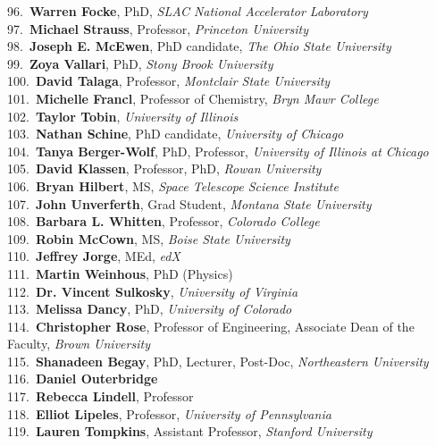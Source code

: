 96.~{\bf Warren Focke}, PhD, {\sl SLAC National Accelerator Laboratory} \\
97.~{\bf Michael Strauss}, Professor, {\sl Princeton University} \\
98.~{\bf Joseph E. McEwen}, PhD candidate, {\sl The Ohio State University } \\
99.~{\bf Zoya Vallari}, PhD, {\sl Stony Brook University} \\
100.~{\bf David Talaga}, Professor, {\sl Montclair State University } \\
101.~{\bf Michelle Francl}, Professor of Chemistry, {\sl Bryn Mawr College} \\
102.~{\bf Taylor Tobin}, {\sl University of Illinois} \\
103.~{\bf Nathan Schine}, PhD candidate, {\sl University of Chicago} \\
104.~{\bf Tanya Berger-Wolf}, PhD, Professor, {\sl University of Illinois at Chicago} \\
105.~{\bf David Klassen}, Professor, PhD, {\sl Rowan University} \\
106.~{\bf Bryan Hilbert}, MS, {\sl Space Telescope Science Institute} \\
107.~{\bf John Unverferth}, Grad Student, {\sl Montana State University} \\
108.~{\bf Barbara L. Whitten}, Professor, {\sl Colorado College} \\
109.~{\bf Robin McCown}, MS, {\sl Boise State University} \\
110.~{\bf Jeffrey Jorge}, MEd, {\sl edX} \\
111.~{\bf Martin Weinhous}, PhD (Physics) \\
112.~{\bf Dr. Vincent Sulkosky}, {\sl University of Virginia} \\
113.~{\bf Melissa Dancy}, PhD, {\sl University of Colorado} \\
114.~{\bf Christopher Rose}, Professor of Engineering,  Associate Dean of the Faculty, {\sl Brown University} \\
115.~{\bf Shanadeen Begay}, PhD, Lecturer, Post-Doc, {\sl Northeastern University} \\
116.~{\bf Daniel Outerbridge} \\
117.~{\bf Rebecca Lindell}, Professor \\
118.~{\bf Elliot Lipeles}, Professor, {\sl University of Pennsylvania} \\
119.~{\bf Lauren Tompkins}, Assistant Professor, {\sl Stanford University} \\
